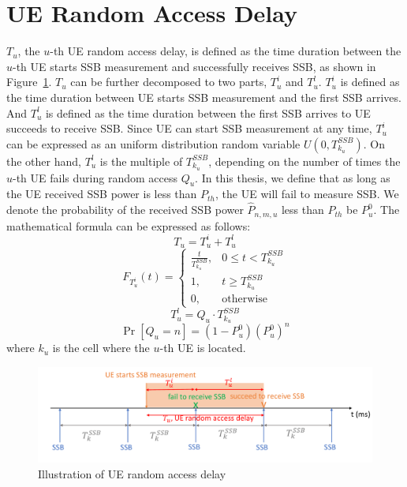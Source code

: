 \section{UE Random Access Delay}

$T_u$, the $u$-th UE random access delay, is defined as the time duration between the $u$-th UE starts SSB measurement and successfully receives SSB, as shown in Figure~\ref{RAD}. $T_u$ can be further decomposed to two parts, $T_u^i$ and $T_u^l$. $T_u^i$ is defined as the time duration between UE starts SSB measurement and the first SSB arrives. And $T_u^l$ is defined as the time duration between the first SSB arrives to UE succeeds to receive SSB. Since UE can start SSB measurement at any time, $T_u^i$ can be expressed as an uniform distribution random variable $U(0, T_{k_u}^{SSB})$. On the other hand, $T_u^l$ is the multiple of $T_{k_u}^{SSB}$, depending on the number of times the $u$-th UE fails during random access $Q_u$. In this thesis, we define that as long as the UE received SSB power is less than $P_{th}$, the UE will fail to measure SSB. We denote the probability of the received SSB power $\hat{P}_{n, m, u}$ less than $P_{th}$ be $P_u^0$. The mathematical formula can be expressed as follows:
\begin{equation}
    T_u = T_u^i + T_u^l
\end{equation}
\begin{equation}
    F_{T_u^i}(t) = 
    \begin{cases}
        \frac{t}{T_{k_u}^{SSB}}, & 0 \leq t< T_{k_u}^{SSB} \\
        1, & t \geq T_{k_u}^{SSB} \\
        0, & \text{otherwise}
    \end{cases}
\end{equation}
\begin{equation}
    T_u^l = Q_u \cdot T_{k_u}^{SSB}
\end{equation}
\begin{equation}
    \Pr\left[Q_u = n\right] = (1 - P_u^0) (P_u^0)^n
\end{equation}
where $k_u$ is the cell where the $u$-th UE is located.

\begin{figure}[h!]
    \centering
    \includegraphics[width=1\textwidth]{figure/random access delay.pdf}
    \caption{Illustration of UE random access delay}
    \label{RAD}
\end{figure}


